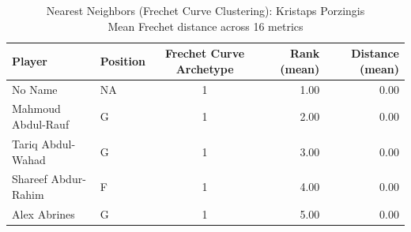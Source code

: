 \begin{table}[t]
\caption*{
{\fontsize{20}{25} Nearest Neighbors (Frechet Curve Clustering): Kristaps Porzingis\fontsize{12}{15}\selectfont } \\ 
{\fontsize{14}{17}\selectfont  Mean Frechet distance across 16 metrics\fontsize{12}{15}\selectfont }
} 
\fontsize{12.0pt}{14.0pt}\selectfont
\begin{tabular*}{\linewidth}{@{\extracolsep{\fill}}llcrr}
\toprule
Player & Position & Frechet Curve Archetype & Rank (mean) & Distance (mean) \\ 
\midrule\addlinespace[2.5pt]
No Name & NA & 1 & 1.00 & 0.00 \\ 
Mahmoud Abdul-Rauf & G & 1 & 2.00 & 0.00 \\ 
Tariq Abdul-Wahad & G & 1 & 3.00 & 0.00 \\ 
Shareef Abdur-Rahim & F & 1 & 4.00 & 0.00 \\ 
Alex Abrines & G & 1 & 5.00 & 0.00 \\ 
\bottomrule
\end{tabular*}
\end{table}

